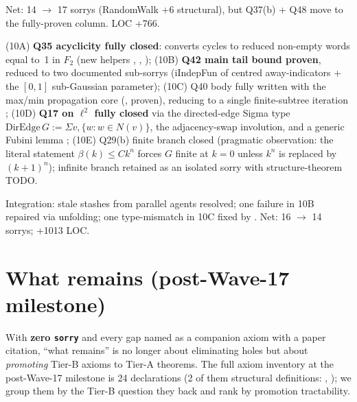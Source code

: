 \documentclass[11pt,a4paper]{article}
\newcommand{\cmd}[1]{\texttt{\small #1}}
\theoremstyle{plain}
\theoremstyle{definition}
\begin{document}
Net: 14 $\to$ 17 sorrys (RandomWalk +6 structural), but Q37(b) + Q48
move to the fully-proven column. LOC +766.

(10A) \textbf{Q35 acyclicity fully closed}: converts cycles to reduced
non-empty words equal to~1 in $F_2$ (new helpers
, , );
(10B) \textbf{Q42 main tail bound
 proven}, reduced to two documented
sub-sorrys (iIndepFun of centred away-indicators + the $[0,1]$
sub-Gaussian parameter);
(10C) Q40  body fully written with the
max/min propagation core (,
 proven), reducing to a single
finite-subtree iteration ;
(10D) \textbf{Q17 on $\ell^2$ fully closed} via the directed-edge
Sigma type $\text{DirEdge}\,G := \Sigma v,\{w : w \in N(v)\}$, the
adjacency-swap involution, and a generic Fubini lemma
;
(10E) Q29(b) finite branch closed (pragmatic observation: the literal
statement $\beta(k)\le Ck^n$ forces $G$ finite at $k=0$ unless
$k^n$ is replaced by $(k+1)^n$); infinite branch retained as an
isolated sorry with structure-theorem TODO.

Integration: stale stashes from parallel agents resolved; one
 failure in 10B repaired via 
unfolding; one  type-mismatch in 10C
fixed by . Net: 16 $\to$ 14 sorrys; +1013 LOC.

\section{What remains (post-Wave-17 milestone)}

With \textbf{zero \cmd{sorry}} and every gap named as a companion
axiom with a paper citation, ``what remains'' is no longer about
eliminating holes but about \emph{promoting} Tier-B axioms to Tier-A
theorems. The full axiom inventory at the post-Wave-17 milestone is
24 declarations (2 of them structural definitions:
, ); we group them by the
Tier-B question they back and rank by promotion tractability.
\end{document}
